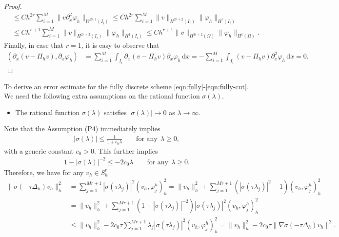 \documentclass[a4paper, oneside]{book}
\def\d{{\mathrm{d}}}
\def\d{\mathrm{d}}
\def\II{(\Omega)}
\def\fy{\varphi}
\begin{document}
\begin{proof}
\begin{align*}
&\le C h^{2r} \sum_{i=1}^M \|  v  \partial_x^2 \fy_h  \|_{W^{2r,1}(I_i)} \le  C h^{2r} \sum_{i=1}^M \|   v  \|_{H^{2r+2}(I_i)}  \| \fy_h  \|_{H^{r}(I_i)}\\
&\le Ch^{r+1} \sum_{i=1}^M \|   v  \|_{H^{2r+2}(I_i)}  \| \fy_h  \|_{H^{1}(I_i)} \le Ch^{r+1}  \|   v  \|_{H^{2r+2}\II}  \| \fy_h  \|_{H^{1}\II}.
\end{align*}
Finally, in case that $r=1$, it is easy to observe that
\begin{align*}
 ( \partial_x (v- \Pi_h v), \partial_x \fy_h )
 &= \sum_{i=1}^M \int_{I_i}  \partial_x (v- \Pi_h v) \partial_x \fy_h \,\d x
 =-\sum_{i=1}^M \int_{I_i}    (v- \Pi_h v) \partial_x^2 \fy_h \,\d x=0.
\end{align*}
\end{proof}

To derive an error estimate for the fully discrete scheme \eqref{eqn:fully}-\eqref{eqn:fully-cut}. We need the following extra assumptions on the
rational function $\sigma(\lambda)$.
\begin{itemize}
\item[{\bf (P4)}] The rational function $\sigma(\lambda)$ satisfies $|\sigma(\lambda)| \rightarrow 0$ as $\lambda\rightarrow\infty$.
\end{itemize}
Note that the Assumption (P4) immediately implies \cite[eq. (7.37)]{Thomee:2006}
\begin{align*}
 |\sigma(\lambda)| \le \frac{1}{1+c_0\lambda} \qquad \text{for any}~~\lambda\ge 0,
\end{align*}
with a generic constant $c_0>0$. This further implies
\begin{align*}
 1-|\sigma(\lambda)|^{-2} \le - 2 c_0 \lambda\qquad \text{for any}~~\lambda\ge 0.
\end{align*}
Therefore, we have for any $v_h\in S_h^r$
\begin{align*}
 \|  \sigma(-\tau\Delta_h) v_h \|_h^2 &= \sum_{j=1}^{Mr+1} |\sigma(\tau\lambda_j)|^2 (v_h, \fy_j^h)_h^2
 = \|  v_h \|_h^2 +  \sum_{j=1}^{Mr+1} (|\sigma(\tau\lambda_j)|^2-1) (v_h, \fy_j^h)_h^2 \\
 &=\|  v_h \|_h^2 + \sum_{j=1}^{Mr+1} (1-|\sigma(\tau\lambda_j)|^{-2}) |\sigma(\tau\lambda_j)|^2(v_h, \fy_j^h)_h^2\\
 &\le \|  v_h \|_h^2 - 2c_0\tau \sum_{j=1}^{Mr+1}  \lambda_j |\sigma(\tau\lambda_j)|^2(v_h, \fy_j^h)_h^2
 = \|  v_h \|_h^2 - 2c_0\tau \| \nabla \sigma(-\tau\Delta_h) v_h\|^2.
\end{align*}
\end{document}
